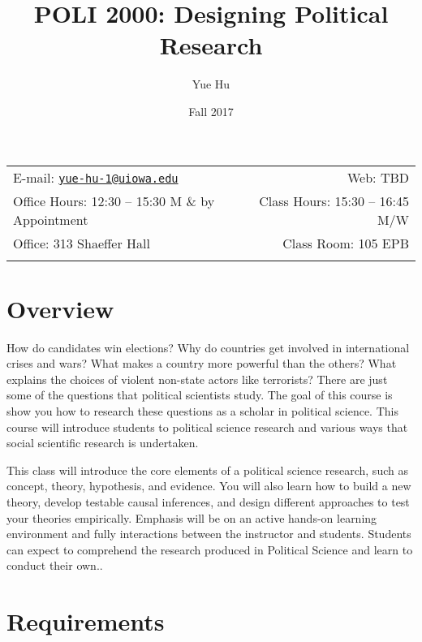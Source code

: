 \documentclass[11pt,]{article}
\title{POLI 2000: Designing Political Research}
\author{Yue Hu}
\date{Fall 2017}
\theoremstyle{definition}
\theoremstyle{definition}
\theoremstyle{remark}
\begin{document}
  

		\maketitle
		
	
		\thispagestyle{firststyle}



	\noindent \begin{tabular*}{\textwidth}{ @{\extracolsep{\fill}} lr @{\extracolsep{\fill}}}


E-mail: \texttt{\href{mailto:yue-hu-1@uiowa.edu}{\nolinkurl{yue-hu-1@uiowa.edu}}} & Web: TBD\\
Office Hours: 12:30 -- 15:30 M \& by Appointment  &  Class Hours: 15:30 -- 16:45 M/W\\
Office: 313 Shaeffer Hall  & Class Room: 105 EPB\\
	&  \\
	\hline
	\end{tabular*}
	
\vspace{2mm}
	


\section{Overview}\label{overview}

How do candidates win elections? Why do countries get involved in
international crises and wars? What makes a country more powerful than
the others? What explains the choices of violent non-state actors like
terrorists? There are just some of the questions that political
scientists study. The goal of this course is show you how to research
these questions as a scholar in political science. This course will
introduce students to political science research and various ways that
social scientific research is undertaken.

This class will introduce the core elements of a political science
research, such as concept, theory, hypothesis, and evidence. You will
also learn how to build a new theory, develop testable causal
inferences, and design different approaches to test your theories
empirically. Emphasis will be on an active hands-on learning environment
and fully interactions between the instructor and students. Students can
expect to comprehend the research produced in Political Science and
learn to conduct their own..

\section{Requirements}\label{requirements}
\end{document}
